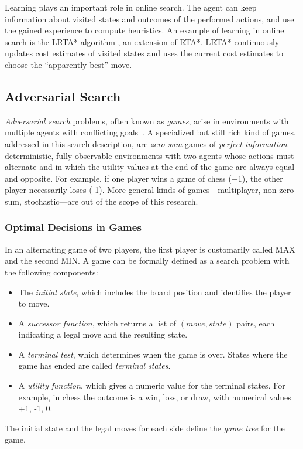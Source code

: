 Learning plays an important role in online search. The agent can keep
information about visited states and outcomes of the performed
actions, and use the gained experience to compute heuristics. An
example of learning in online search is the LRTA* algorithm
\cite{Korf.rta}, an extension of RTA*. LRTA* continuously
updates cost estimates of visited states and uses the current cost
estimates to choose the ``apparently best'' move.

\subsection{Adversarial Search}

{\em Adversarial search} problems, often known as {\em games}, arise
in environments with multiple agents with conflicting
goals~\cite{Russell.aima}. A specialized but still rich kind of games,
addressed in this search description, are {\em zero-sum} games of {\em
  perfect information} --- deterministic, fully observable
environments with two agents whose actions must alternate and in which
the utility values at the end of the game are always equal and
opposite. For example, if one player wins a game of chess (+1), the
other player necessarily loses (-1).  More general kinds of
games---multiplayer, non-zero-sum, stochastic---are out of the scope of
this research.

\subsubsection{Optimal Decisions in Games}

In an alternating game of two players, the first player is customarily
called MAX and the second MIN. A game can be formally defined as a
search problem with the following components:
\begin{itemize}
\item The {\em initial state}, which includes the board position and
  identifies the player to move.
\item A {\em successor function}, which returns a list of $(move,
  state)$ pairs, each indicating a legal move and the resulting state.
\item A {\em terminal test}, which determines when the game is
  over. States where the game has ended are called {\em terminal
    states}.
\item A {\em utility function}, which gives a numeric value for the
  terminal states. For example, in chess the outcome is a win, loss,
  or draw, with numerical values +1, -1, 0.
\end{itemize}
The initial state and the legal moves for each side define the {\em
  game tree} for the game.

